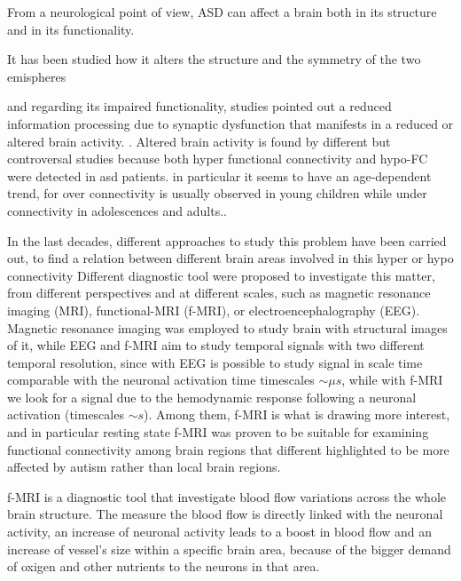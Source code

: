 \documentclass[11pt]{report}
\begin{document}
From a neurological point of view, ASD can affect a brain both in its structure and in its functionality.

It has been studied how it alters the structure and the symmetry of the two emispheres \cite{postema2019}


and regarding its impaired functionality, studies pointed out a reduced information processing due to synaptic dysfunction that manifests in a reduced or altered brain activity. \cite{spera-2019}.
Altered brain activity is found by different but controversal studies because both hyper functional connectivity and hypo-FC were detected in asd patients.
in particular it seems to have an age-dependent trend, for over connectivity is usually observed in young children while under connectivity in adolescences and adults.\cite{supekar-2013}.

In the last decades, different approaches to study this problem have been carried out, to find a relation between different brain areas involved in this hyper or hypo connectivity
Different diagnostic tool were proposed to investigate this matter, from different perspectives and at different scales, such as magnetic resonance imaging (MRI), functional-MRI (f-MRI), or electroencephalography (EEG).
Magnetic resonance imaging was employed to study brain with structural images of it, while EEG and f-MRI aim to study temporal signals with two different temporal resolution, since with EEG is possible to study signal in scale time comparable with the neuronal activation time timescales $\sim \mu s$, while with f-MRI we look for a signal due to the hemodynamic response following a neuronal activation (timescales $\sim s$).
Among them, f-MRI is what is drawing more interest, and in particular resting state f-MRI was proven to be suitable for examining functional connectivity among brain regions that different highlighted to be more affected by autism rather than local brain regions.

f-MRI is a diagnostic tool that investigate blood flow variations across the whole brain structure.
The measure the blood flow is directly linked with the neuronal activity, an increase of neuronal activity leads to a boost in blood flow and an increase of vessel's size within a specific brain area, because of the bigger demand of oxigen and other nutrients to the neurons in that area.
\end{document}
